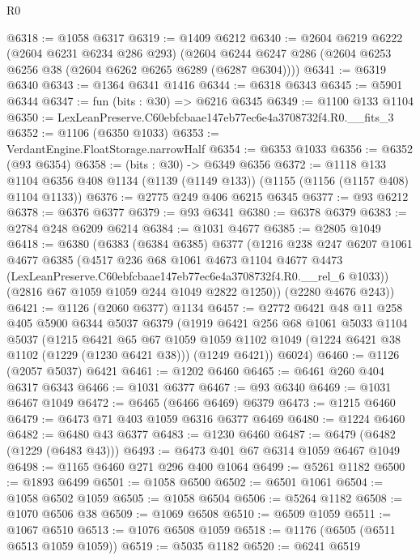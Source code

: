 \begin{lexlean}{R0}
\begin{coremodule}
@6318 := @1058 @6317
@6319 := @1409 @6212
@6340 := @2604
    @6219
    @6222
    (@2604 @6231 @6234 @286 @293)
    (@2604 @6244 @6247 @286 (@2604 @6253 @6256 @38 (@2604 @6262 @6265 @6289 (@6287 @6304))))
@6341 := @6319 @6340
@6343 := @1364 @6341 @1416
@6344 := @6318 @6343
@6345 := @5901 @6344
@6347 := fun (bits : @30) => @6216 @6345
@6349 := @1100 @133 @1104
@6350 := LexLeanPreserve.C60ebfcbaae147eb77ec6e4a3708732f4.R0.__fits_3
@6352 := @1106 (@6350 @1033)
@6353 := VerdantEngine.FloatStorage.narrowHalf
@6354 := @6353 @1033
@6356 := @6352 (@93 @6354)
@6358 := (bits : @30) -> @6349 @6356
@6372 := @1118
    @133
    @1104
    @6356
    @408
    @1134
    (@1139 (@1149 @133))
    (@1155 (@1156 (@1157 @408) @1104 @1133))
@6376 := @2775 @249 @406 @6215 @6345
@6377 := @93 @6212
@6378 := @6376 @6377
@6379 := @93 @6341
@6380 := @6378 @6379
@6383 := @2784 @248 @6209 @6214
@6384 := @1031 @4677
@6385 := @2805 @1049
@6418 := @6380
    (@6383
      (@6384 @6385)
      @6377
      (@1216
        @238
        @247
        @6207
        @1061
        @4677
        @6385
        (@4517
          @236
          @68
          @1061
          @4673
          @1104
          @4677
          @4473
          (LexLeanPreserve.C60ebfcbaae147eb77ec6e4a3708732f4.R0.__rel_6 @1033))
        (@2816 @67 @1059 @1059 @244 @1049 @2822 @1250))
      (@2280 @4676 @243))
@6421 := @1126 (@2060 @6377) @1134
@6457 := @2772
    @6421
    @48
    @11
    @258
    @405
    @5900
    @6344
    @5037
    @6379
    (@1919
      @6421
      @256
      @68
      @1061
      @5033
      @1104
      @5037
      (@1215
        @6421
        @65
        @67
        @1059
        @1059
        @1102
        @1049
        (@1224 @6421 @38 @1102 (@1229 (@1230 @6421 @38)))
        (@1249 @6421))
      @6024)
@6460 := @1126 (@2057 @5037) @6421
@6461 := @1202 @6460
@6465 := @6461 @260 @404 @6317 @6343
@6466 := @1031 @6377
@6467 := @93 @6340
@6469 := @1031 @6467 @1049
@6472 := @6465 (@6466 @6469) @6379
@6473 := @1215 @6460
@6479 := @6473 @71 @403 @1059 @6316 @6377 @6469
@6480 := @1224 @6460
@6482 := @6480 @43 @6377
@6483 := @1230 @6460
@6487 := @6479 (@6482 (@1229 (@6483 @43)))
@6493 := @6473 @401 @67 @6314 @1059 @6467 @1049
@6498 := @1165 @6460 @271 @296 @400 @1064
@6499 := @5261 @1182
@6500 := @1893 @6499
@6501 := @1058 @6500
@6502 := @6501 @1061
@6504 := @1058 @6502 @1059
@6505 := @1058 @6504
@6506 := @5264 @1182
@6508 := @1070 @6506 @38
@6509 := @1069 @6508
@6510 := @6509 @1059
@6511 := @1067 @6510
@6513 := @1076 @6508 @1059
@6518 := @1176 (@6505 (@6511 @6513 @1059 @1059))
@6519 := @5035 @1182
@6520 := @6241 @6519

\end{coremodule}
\end{lexlean}
